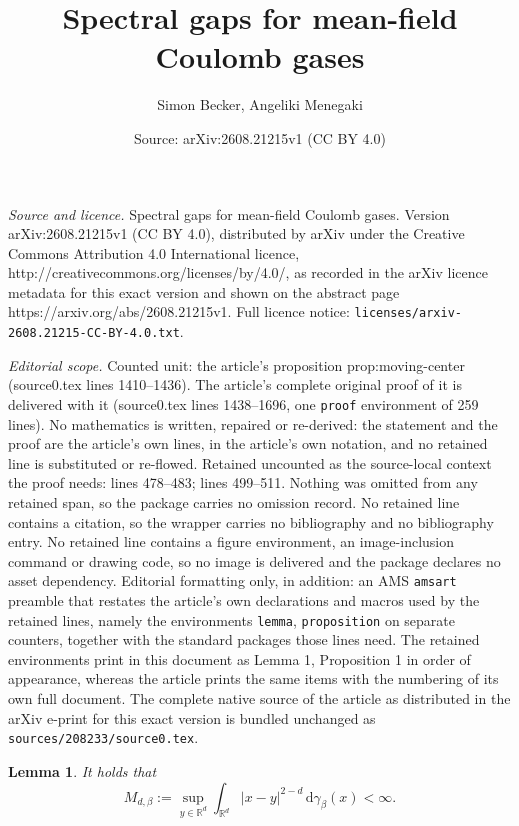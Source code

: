 \documentclass[10pt,a4paper]{amsart}
\title{Spectral gaps for mean-field Coulomb gases}
\author{Simon Becker, Angeliki Menegaki}
\date{Source: arXiv:2608.21215v1 (CC BY 4.0)}
\newtheorem{lemma}{Lemma}
\newcommand{\R}{\mathbb R}
\newcommand{\be}{\beta}
\newcommand{\dd}{\,\mathrm d}
\begin{document}
\maketitle

\noindent\emph{Source and licence.} Spectral gaps for mean-field Coulomb gases. Version arXiv:2608.21215v1 (CC BY 4.0), distributed by arXiv under the Creative Commons Attribution 4.0 International licence, http://creativecommons.org/licenses/by/4.0/, as recorded in the arXiv licence metadata for this exact version and shown on the abstract page https://arxiv.org/abs/2608.21215v1. Full licence notice: \texttt{licenses/arxiv-2608.21215-CC-BY-4.0.txt}.\par\smallskip

\noindent\textit{Editorial scope.} Counted unit: the article's proposition prop:moving-center (source0.tex lines 1410--1436). The article's complete original proof of it is delivered with it (source0.tex lines 1438--1696, one \texttt{proof} environment of 259 lines). No mathematics is written, repaired or re-derived: the statement and the proof are the article's own lines, in the article's own notation, and no retained line is substituted or re-flowed.  Retained uncounted as the source-local context the proof needs: lines 478--483; lines 499--511.  Nothing was omitted from any retained span, so the package carries no omission record.  No retained line contains a citation, so the wrapper carries no bibliography and no bibliography entry.  No retained line contains a figure environment, an image-inclusion command or drawing code, so no image is delivered and the package declares no asset dependency.  Editorial formatting only, in addition: an AMS \texttt{amsart} preamble that restates the article's own declarations and macros used by the retained lines, namely the environments \texttt{lemma}, \texttt{proposition} on separate counters, together with the standard packages those lines need.  The retained environments print in this document as Lemma 1, Proposition 1 in order of appearance, whereas the article prints the same items with the numbering of its own full document.  The complete native source of the article as distributed in the arXiv e-print for this exact version is bundled unchanged as \texttt{sources/208233/source0.tex}.
\begin{lemma}\label{lem:gaussian-moment}
It holds that \begin{equation*} 
 M_{d,\be}:=
 \sup_{y\in\R^d}\int_{\R^d}|x-y|^{2-d}\dd\gamma_\be(x)<\infty.
\end{equation*}
\end{lemma}
\end{document}

